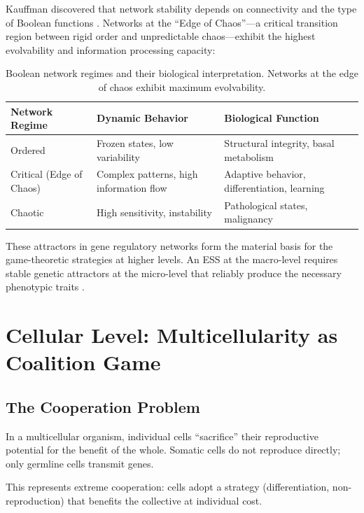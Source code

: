\documentclass[12pt,a4paper]{article}
\theoremstyle{remark}
\begin{document}
Kauffman discovered that network stability depends on connectivity and the type of Boolean functions \citep{BooleanPost}. Networks at the ``Edge of Chaos''---a critical transition region between rigid order and unpredictable chaos---exhibit the highest evolvability and information processing capacity:

\begin{table}[ht]
\centering
\caption{Boolean network regimes and their biological interpretation. Networks at the edge of chaos exhibit maximum evolvability.}
\label{tab:network-regimes}
\begin{tabular}{lll}
\toprule
\textbf{Network Regime} & \textbf{Dynamic Behavior} & \textbf{Biological Function} \\
\midrule
Ordered & Frozen states, low variability & Structural integrity, basal metabolism \\
Critical (Edge of Chaos) & Complex patterns, high information flow & Adaptive behavior, differentiation, learning \\
Chaotic & High sensitivity, instability & Pathological states, malignancy \\
\bottomrule
\end{tabular}
\end{table}

These attractors in gene regulatory networks form the material basis for the game-theoretic strategies at higher levels. An ESS at the macro-level requires stable genetic attractors at the micro-level that reliably produce the necessary phenotypic traits \citep{BooleanMicroarray,KauffmanOrigins}.

\section{Cellular Level: Multicellularity as Coalition Game}
\label{sec:multicellularity}

\subsection{The Cooperation Problem}

In a multicellular organism, individual cells ``sacrifice'' their reproductive potential for the benefit of the whole. Somatic cells do not reproduce directly; only germline cells transmit genes.

This represents extreme cooperation: cells adopt a strategy (differentiation, non-reproduction) that benefits the collective at individual cost.
\end{document}
